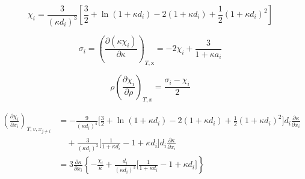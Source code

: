 \documentclass[12pt, letterpaper]{article}
\begin{document}
\begin{equation}
    \chi_{i}=\frac{3}{\left(\kappa d_{i}\right)^3}\left[\frac{3}{2}+\ln(1+\kappa d_{i})-2(1+\kappa d_{i})+\frac{1}{2}\left(1+\kappa d_{i}\right)^2\right]
    \label{eq:chi_dh}
\end{equation}


\begin{equation}
    \sigma_{i}=\left(\frac{\partial(\kappa\chi_{i})}{\partial\kappa}\right)_{T,\mathrm{x}}=-2\chi_{i}+\frac{3}{1+\kappa a_{i}}
    \label{eq:sigma_dh}
\end{equation}


\begin{equation}
    \rho\left(\frac{\partial \chi_i}{\partial \rho}\right)_{T,x}
    =
    \frac{\sigma_i-\chi_i}{2}
    \label{eq:dchi_dh_drho}
\end{equation}


\begin{equation}
    \begin{aligned}
        \left(\frac{\partial\chi_{i}}{\partial x_{i}}\right)_{T,v,x_{j\neq i}}
        &=
        -\frac{9}{\left(\kappa d_{i}\right)^{4}}
        \Biggl[
            \frac{3}{2}+\ln(1+\kappa d_{i})-2(1+\kappa d_{i})
            +\frac{1}{2}\left(1+\kappa d_{i}\right)^{2}
        \Biggr]
        d_{i}\frac{\partial\kappa}{\partial x_{i}}
        \\
        &\quad +
        \frac{3}{\left(\kappa d_{i}\right)^{3}}
        \Biggl[
            \frac{1}{1+\kappa d_{i}}-1+\kappa d_{i}
        \Biggr]
        d_{i}\frac{\partial\kappa}{\partial x_{i}}
        \\
        &=
        3\frac{\partial\kappa}{\partial x_{i}}
        \left\{
            -\frac{\chi_{i}}{\kappa}
            +
            \frac{d_{i}}{\left(\kappa d_{i}\right)^{3}}
            \Biggl[
                \frac{1}{1+\kappa d_{i}}-1+\kappa d_{i}
            \Biggr]
        \right\}
    \end{aligned}
    \label{eq:dchi_dh_dxi}
\end{equation}
\end{document}
